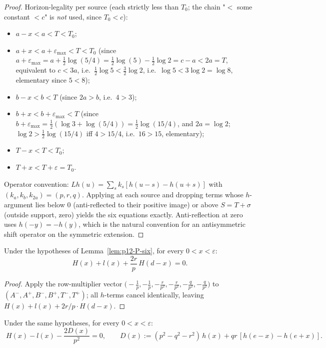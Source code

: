 \begin{proof}
Horizon-legality per source (each strictly less than $T_{0}$; the
chain "$<$ some constant $<c$" is \emph{not} used, since $T_{0} < c$):
\begin{itemize}
\item $a - x < a < T < T_{0}$;
\item $a + x < a + \varepsilon_{\max} < T < T_{0}$
  (since $a + \varepsilon_{\max} = a + \tfrac12\log(5/4)
  = \tfrac12\log(5) - \tfrac12\log 2 = c - a < 2a = T$,
  equivalent to $c < 3a$, i.e.\ $\tfrac12\log 5 < \tfrac32\log 2$,
  i.e.\ $\log 5 < 3\log 2 = \log 8$, elementary since $5 < 8$);
\item $b - x < b < T$ (since $2a > b$, i.e.\ $4 > 3$);
\item $b + x < b + \varepsilon_{\max} < T$ (since
  $b + \varepsilon_{\max} = \tfrac12(\log 3 + \log(5/4))
  = \tfrac12\log(15/4)$, and $2a = \log 2$;
  $\log 2 > \tfrac12\log(15/4)$ iff $4 > 15/4$, i.e.\ $16 > 15$,
  elementary);
\item $T - x < T < T_{0}$;
\item $T + x < T + \varepsilon = T_{0}$.
\end{itemize}
Operator convention: $Lh(u) = \sum_{s} k_{s}[h(u - s) - h(u + s)]$
with $(k_{a}, k_{b}, k_{2a}) = (p, r, q)$.  Applying at each source
and dropping terms whose $h$-argument lies below $0$ (anti-reflected
to their positive image) or above $S = T + \sigma$ (outside support,
zero) yields the six equations exactly.  Anti-reflection at zero
uses $h(-y) = -h(y)$, which is the natural convention for an
antisymmetric shift operator on the symmetric extension.
\end{proof}

\begin{theorem}[Identity P1]\label{thm:p12-P1}
Under the hypotheses of Lemma~\ref{lem:p12-P-six}, for every
$0 < x < \varepsilon$:
\[
\boxed{\; H(x) + l(x) + \frac{2 r}{p}\, H(d - x) = 0.\;}
\]
\end{theorem}

\begin{proof}
Apply the row-multiplier vector
$\bigl(-\tfrac{1}{p}, -\tfrac{1}{p}, -\tfrac{r}{p^{2}},
-\tfrac{r}{p^{2}}, -\tfrac{q}{p^{2}}, -\tfrac{q}{p^{2}}\bigr)$
to $(A^{-}, A^{+}, B^{-}, B^{+}, T^{-}, T^{+})$; all
$h$-terms cancel identically, leaving $H(x) + l(x) + 2r/p \cdot H(d - x)$.
\end{proof}

\begin{theorem}[Identity P2]\label{thm:p12-P2}
Under the same hypotheses, for every $0 < x < \varepsilon$:
\[
\boxed{\; H(x) - l(x) - \frac{2 D(x)}{p^{2}} = 0,\qquad
D(x) := (p^{2} - q^{2} - r^{2})\, h(x) + q r\,[h(e - x) - h(e + x)].\;}
\]
\end{theorem}

